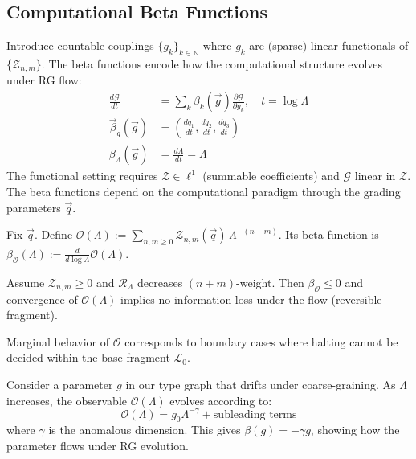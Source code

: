 \subsection{Computational Beta Functions}

\begin{definition}
\label{def:computational-beta-functions}
Introduce countable couplings $\{g_k\}_{k \in \mathbb{N}}$ where $g_k$ are (sparse) linear functionals of $\{\mathcal{Z}_{n,m}\}$. The beta functions encode how the computational structure evolves under RG flow:
\begin{align}
\frac{d\mathcal{G}}{dt} &= \sum_k \beta_k(\vec{g}) \frac{\partial \mathcal{G}}{\partial g_k}, \quad t = \log \Lambda \\
\vec{\beta}_q(\vec{g}) &= \left(\frac{dq_1}{dt}, \frac{dq_2}{dt}, \frac{dq_3}{dt}\right) \\
\beta_\Lambda(\vec{g}) &= \frac{d\Lambda}{dt} = \Lambda
\end{align}
The functional setting requires $\mathcal{Z} \in \ell^1$ (summable coefficients) and $\mathcal{G}$ linear in $\mathcal{Z}$. The beta functions depend on the computational paradigm through the grading parameters $\vec{q}$.
\end{definition}

\begin{definition}
\label{def:global-observable}
Fix $\vec{q}$. Define $\mathcal{O}(\Lambda):=\sum_{n,m\ge0}\mathcal{Z}_{n,m}(\vec{q})\,\Lambda^{-(n+m)}$.
Its beta-function is $\beta_\mathcal{O}(\Lambda):=\frac{d}{d\log\Lambda}\mathcal{O}(\Lambda)$.
\end{definition}

\begin{proposition}
\label{prop:rg-corresp}
Assume $\mathcal{Z}_{n,m}\ge0$ and $\mathcal{R}_\Lambda$ decreases $(n+m)$-weight.
Then $\beta_\mathcal{O}\le0$ and convergence of $\mathcal{O}(\Lambda)$ implies
no information loss under the flow (reversible fragment).
\end{proposition}

\begin{conjecture}
\label{conj:marginal}
Marginal behavior of $\mathcal{O}$ corresponds to boundary cases where halting cannot
be decided within the base fragment $\mathcal{L}_0$.
\end{conjecture}

\begin{example}
\label{ex:synthetic-rg-flow}
Consider a parameter $g$ in our type graph that drifts under coarse-graining. As $\Lambda$ increases, the observable $\mathcal{O}(\Lambda)$ evolves according to:
\[
\mathcal{O}(\Lambda) = g_0 \Lambda^{-\gamma} + \text{subleading terms}
\]
where $\gamma$ is the anomalous dimension. This gives $\beta(g) = -\gamma g$, showing how the parameter flows under RG evolution.
\end{example}


